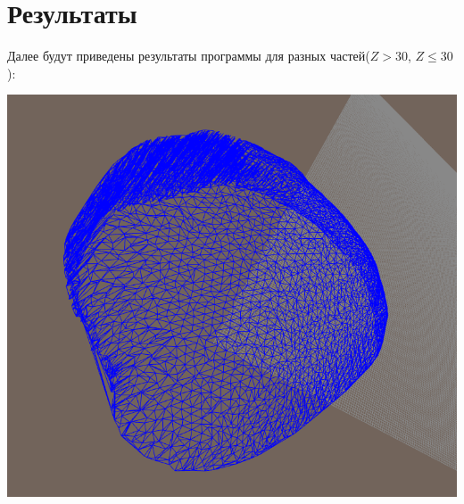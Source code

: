 \documentclass[a4paper, 12pt]{article}   	%
\begin{document}
\section{Результаты}
    Далее будут приведены результаты программы для разных частей($Z > 30$, $Z \leq 30$):
    
    \begin{center}
        \begin{minipage}{0.7\linewidth}
            \includegraphics[width=\linewidth]{img/up_view_above_0}
        \end{minipage}
    \end{center}
\end{document}
